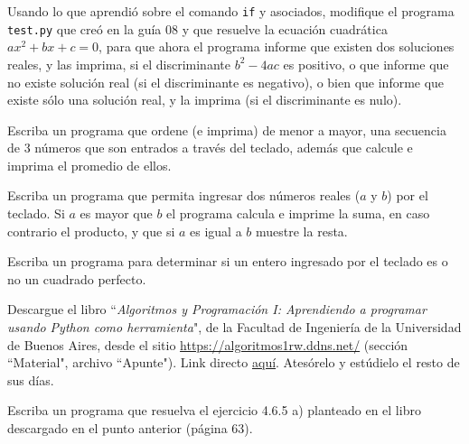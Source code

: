 \documentclass[11pt]{exam}
\begin{document}
\begin{questions}
\item Usando lo que aprendió sobre el comando \texttt{if} y asociados, modifique el programa \texttt{test.py} que creó en la guía 08 y que resuelve la ecuación cuadrática $ax^2+bx+c=0$, para que ahora el programa informe que existen dos soluciones reales, y las imprima, si el discriminante $b^2-4ac$ es positivo, o que informe que no existe solución real (si el discriminante es negativo), o bien que informe que existe sólo una solución real, y la imprima (si el discriminante es nulo).


\item Escriba un programa que ordene (e imprima) de menor a mayor, una secuencia de 3 números que son entrados a través del teclado, además que calcule e imprima el promedio de ellos.

\item Escriba un programa que permita ingresar dos números reales ($a$ y $b$) por el teclado. Si $a$ es mayor que $b$ el programa calcula e imprime la suma, en caso contrario el producto, y que si $a$ es igual a $b$ muestre la resta. 


\item Escriba un programa para determinar si un entero ingresado por el teclado es o no un cuadrado perfecto. 

\item Descargue el libro ``\textit{Algoritmos y Programación I: Aprendiendo a programar usando Python como herramienta}", de la Facultad de Ingeniería de la Universidad de Buenos Aires, desde el sitio \url{https://algoritmos1rw.ddns.net/} (sección ``Material", archivo ``Apunte"). Link directo \href{https://drive.google.com/file/d/0B0KKEIBDHL7tdEQ3bFZ2M3VrZzA/view}{aqu\'i}. Atesórelo y estúdielo el resto de sus días.

\item Escriba un programa que resuelva el ejercicio 4.6.5 a) planteado en el libro descargado en el punto anterior (página 63).


\end{questions}
\end{document}
